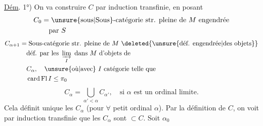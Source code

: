 \uline{Dém}. 1°) On va construire $C$ par induction transfinie, en posant
\[
\begin{aligned}
C_0&=\text{\unsure{sous|Sous}-catégorie str. pleine de $M$ engendrée}\\
&\quad\text{par $S$}
\end{aligned}
\]
\[
\begin{aligned}
C_{\alpha+1}&=\text{Sous-catégorie str. pleine de $M$ \deleted{\unsure{déf. engendrée|des objets}}}\\
&\quad\text{déf. par les }\varinjlim_I\text{ dans $M$ d'objets de}\\
&\quad C_\alpha,\quad\text{\unsure{où|avec} $I$ catégorie telle que}\\
&\quad\operatorname{card}\mathrm{Fl}\,I\leq\pi_0
\end{aligned}
\]
\[
C_\alpha=\bigcup_{\alpha'<\alpha}C_{\alpha'},\quad\text{si $\alpha$ est un ordinal limite.}
\]
Cela définit   unique les $C_\alpha$ (pour $\forall$ petit ordinal $\alpha$). Par la définition de $C$, on voit par induction transfinie que les $C_\alpha$ sont $\subset C$. Soit $\alpha_0$

